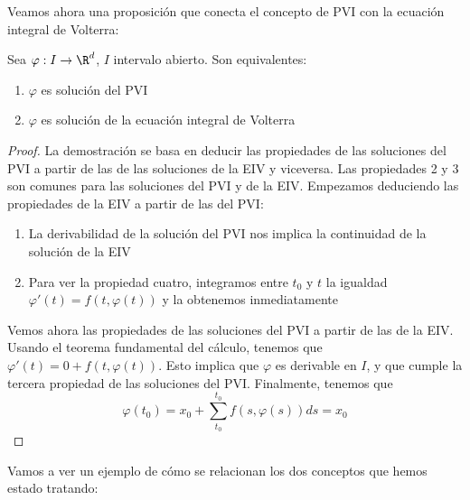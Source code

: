 \documentclass{article}
\begin{document}
Veamos ahora una proposición que conecta el concepto de PVI con la ecuación integral de Volterra:

\begin{prop}
  Sea $\varphi: I \to \R^d$, $I$ intervalo abierto. Son equivalentes:
  \begin{enumerate}
  \item $\varphi$ es solución del PVI
  \item $\varphi$ es solución de la ecuación integral de Volterra
  \end{enumerate}
\end{prop}

\begin{proof}
  La demostración se basa en deducir las propiedades de las soluciones del PVI a partir de las de
  las soluciones de la EIV y viceversa. Las propiedades 2 y 3 son comunes para las soluciones del
  PVI y de la EIV. Empezamos deduciendo las propiedades de la EIV a partir de las del PVI:
  \begin{enumerate}
  \item La derivabilidad de la solución del PVI nos implica la continuidad de la solución de la EIV
  \item Para ver la propiedad cuatro, integramos entre $t_0$ y $t$ la igualdad
    $\varphi'(t) = f(t, \varphi(t))$ y la obtenemos inmediatamente
  \end{enumerate}
  Vemos ahora las propiedades de las soluciones del PVI a partir de las de la EIV.  Usando el
  teorema fundamental del cálculo, tenemos que $\varphi'(t) = 0 + f(t, \varphi(t))$.  Esto implica
  que $\varphi$ es derivable en $I$, y que cumple la tercera propiedad de las soluciones del
  PVI. Finalmente, tenemos que
    $$ \varphi(t_0) = x_0 + \sum_{t_0}^{t_0} f(s, \varphi(s))ds = x_0 $$
  \end{proof}

  Vamos a ver un ejemplo de cómo se relacionan los dos conceptos que hemos estado tratando:
\end{document}
